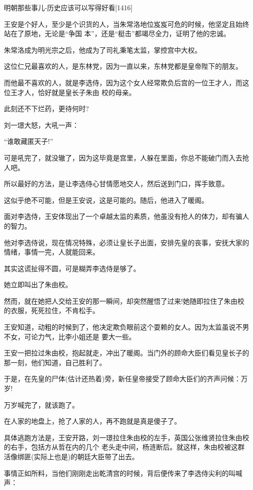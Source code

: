 \documentclass[11pt,a4paper,onecolumn]{article}
\begin{document}
明朝那些事儿-历史应该可以写得好看$[$1416$]$

王安是个好人，至少是个识货的人，当朱常洛地位岌岌可危的时候，他坚定且始终站在了原地，无论是``争国
本''，还是``梃击''都竭尽全力，证明了他的忠诚。

朱常洛成为明光宗之后，他成为了司礼秉笔太监，掌控宫中大权。

这位仁兄最喜欢的人，是东林党，因为一直以来，东林党都是皇帝陛下的朋友。

而他最不喜欢的人，就是李选侍，因为这个女人经常欺负后宫的一位王才人，而这位王才人，恰好就是皇长子朱由
校的母亲。

此刻还不下烂药，更待何时?

刘一璟大怒，大吼一声：

``谁敢藏匿天子!''

可是吼完了，就没辙了，因为这毕竟是宫里，人躲在里面，你总不能破门而入去抢人吧。

所以最好的方法，是让李选侍心甘情愿地交人，然后送到门口，挥手致意。

这似乎绝不可能，但是王安说，这是可能的。随后，他进入了暖阁。

面对李选侍，王安体现出了一个卓越太监的素质，他虽没有抢人的体力，却有骗人的智力。

他对李选侍说，现在情况特殊，必须让皇长子出面，安排先皇的丧事，安抚大家的情绪，事情一完，人就能回来。

其实这谎扯得不圆，可是糊弄李选侍是够了。

她立即叫出了朱由校。

然而，就在她把人交给王安的那一瞬间，却突然醒悟了过来!她随即拉住了朱由校的衣服，死死拉住，不肯松手。

王安知道，动粗的时候到了，他决定欺负眼前这个耍赖的女人。因为太监虽说不男不女，可论力气，比李小姐还是
要大一些。

王安一把拉过朱由校，抱起就走，冲出了暖阁。当门外的顾命大臣们看见皇长子的那一刻，他们知道，自己胜利了。

于是，在先皇的尸体(估计还热着)旁，新任皇帝接受了顾命大臣们的齐声问候：万岁!

万岁喊完了，就该跑了。

在人家的地盘上，抢了人家的人，再不跑就是真是傻子了。

具体逃跑方法是，王安开路，刘一璟拉住朱由校的左手，英国公张维贤拉住朱由校的右手，包括方从哲在内的几个
老头走中间，杨涟断后。就这样，朱由校被这群活像绑匪(实际上也是)的朝廷大臣带了出去。

事情正如所料，当他们刚刚走出乾清宫的时候，背后便传来了李选侍尖利的叫喊声：
\end{document}
